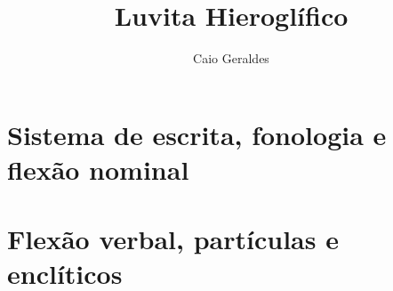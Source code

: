 \documentclass[a4paper,12pt]{memoir}
\title{Luvita Hieroglífico}
\author{Caio Geraldes}
\begin{document}
\setlength{\Exlabelsep}{0.5em}
\setlength{\SubExleftmargin}{1.5em}

\frontmatter

\thecoverpage%
\cleardoublepage%
\thetitlepage%


\cleardoublepage%


\cleardoublepage%
\tableofcontents*

\cleardoublepage%
\listoffigures*

\mainmatter%




\chapter{Sistema de escrita, fonologia e flexão nominal}


\chapter{Flexão verbal, partículas e enclíticos}


\backmatter%






%
%



\printbibliography%

\cleardoublepage%

\colofao{}
\end{document}
